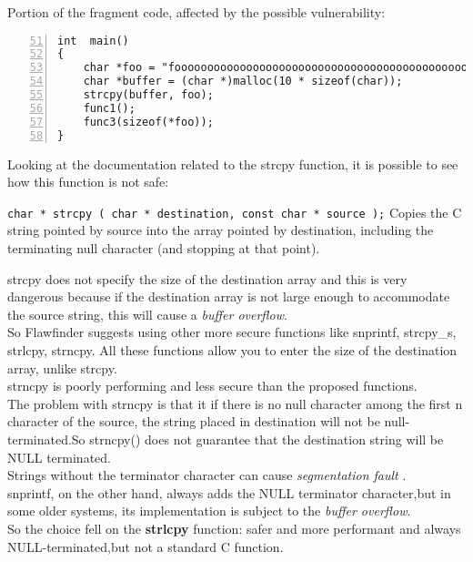 \documentclass[a4paper,12pt]{article}
\newenvironment{SpecialPar}
  {\begin{shaded}}
  {\end{shaded}}
\begin{document}
Portion of the fragment code, affected by the possible vulnerability:
\begin{lstlisting}[style=c,numbers=left,firstnumber=51,linebackgroundcolor={\ifnum\value{lstnumber}=55\color{red}\fi}]
int  main()
{
	char *foo = "fooooooooooooooooooooooooooooooooooooooooooooooooooo";
	char *buffer = (char *)malloc(10 * sizeof(char));
	strcpy(buffer, foo);
	func1();
	func3(sizeof(*foo));
}
\end{lstlisting}
Looking at the documentation related to the strcpy function\cite{strcpy}, it is possible to see how this function is not safe:\\
\begin{SpecialPar}
\noindent
\texttt{char * strcpy ( char * destination, const char * source );}
Copies the C string pointed by source into the array 		pointed by destination, including the terminating null character (and stopping at that point).
\end{SpecialPar}
\noindent
strcpy does not specify the size of the destination array and this is very dangerous because if the destination array is not large enough to accommodate the source string, this will cause a \textit{buffer overflow}.\\
So Flawfinder suggests using other more secure functions like snprintf, strcpy\_s, strlcpy, strncpy.
All these functions allow you to enter the size of the destination array, unlike strcpy.\\
strncpy is poorly performing and less secure than the proposed functions.\\
The problem with strncpy is that it if there is no null character among the first n character of the source, the string placed in destination will not be null-terminated.So strncpy() does not guarantee that the destination string will be NULL terminated.\\ Strings without the terminator character can cause \textit{segmentation fault} \cite{geeksstrcpy}.\\
snprintf, on the other hand, always adds the NULL terminator character,but in some older systems, its implementation is subject to the \textit{buffer overflow}\cite{dangerc}.\\
So the choice fell on the \textbf{strlcpy} function: safer and more performant \cite{dangerc} and always NULL-terminated,but not a standard C function.\\
\end{document}
